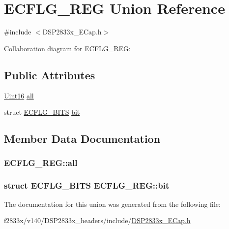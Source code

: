 \hypertarget{union_e_c_f_l_g___r_e_g}{}\section{E\+C\+F\+L\+G\+\_\+\+R\+E\+G Union Reference}
\label{union_e_c_f_l_g___r_e_g}


{\ttfamily \#include $<$D\+S\+P2833x\+\_\+\+E\+Cap.\+h$>$}



Collaboration diagram for E\+C\+F\+L\+G\+\_\+\+R\+E\+G\+:
\subsection*{Public Attributes}
\begin{DoxyCompactItemize}
\item 
\hyperlink{_d_s_p2833x___device_8h_a59a9f6be4562c327cbfb4f7e8e18f08b}{Uint16} \hyperlink{union_e_c_f_l_g___r_e_g_a169489924d1cf0694a41a5d421f2006d}{all}
\item 
struct \hyperlink{struct_e_c_f_l_g___b_i_t_s}{E\+C\+F\+L\+G\+\_\+\+B\+I\+T\+S} \hyperlink{union_e_c_f_l_g___r_e_g_a187d6453b8749a5c349f2bf838581e31}{bit}
\end{DoxyCompactItemize}


\subsection{Member Data Documentation}
\hypertarget{union_e_c_f_l_g___r_e_g_a169489924d1cf0694a41a5d421f2006d}{}
\subsubsection[{all}]{ E\+C\+F\+L\+G\+\_\+\+R\+E\+G\+::all}\label{union_e_c_f_l_g___r_e_g_a169489924d1cf0694a41a5d421f2006d}
\hypertarget{union_e_c_f_l_g___r_e_g_a187d6453b8749a5c349f2bf838581e31}{}
\subsubsection[{bit}]{\setlength{\rightskip}{0pt plus 5cm}struct {\bf E\+C\+F\+L\+G\+\_\+\+B\+I\+T\+S} E\+C\+F\+L\+G\+\_\+\+R\+E\+G\+::bit}\label{union_e_c_f_l_g___r_e_g_a187d6453b8749a5c349f2bf838581e31}


The documentation for this union was generated from the following file\+:\begin{DoxyCompactItemize}
\item 
f2833x/v140/\+D\+S\+P2833x\+\_\+headers/include/\hyperlink{_d_s_p2833x___e_cap_8h}{D\+S\+P2833x\+\_\+\+E\+Cap.\+h}\end{DoxyCompactItemize}
